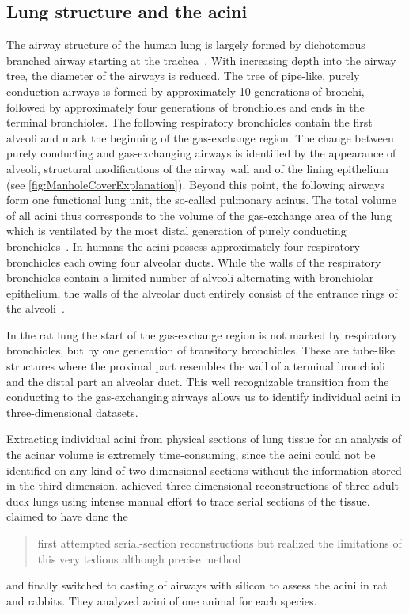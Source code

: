 \documentclass[paper=a4,DIV=calc,abstract,english]{scrartcl}
\begin{document}
\subsection{Lung structure and the acini}
The airway structure of the human lung is largely formed by dichotomous branched airway starting at the trachea~\citep{Weibel1991}.
With increasing depth into the airway tree, the diameter of the airways is reduced.
The tree of pipe-like, purely conduction airways is formed by approximately 10 generations of bronchi, followed by approximately four generations of bronchioles and ends in the terminal bronchioles.
The following respiratory bronchioles contain the first alveoli and mark the beginning of the gas-exchange region.
The change between purely conducting and gas-exchanging airways is identified by the appearance of alveoli, structural modifications of the airway wall and of the lining epithelium (see \autoref{fig:ManholeCoverExplanation}).
Beyond this point, the following airways form one functional lung unit, the so-called pulmonary acinus.
The total volume of all acini thus corresponds to the volume of the gas-exchange area of the lung which is ventilated by the most distal generation of purely conducting bronchioles~\citep{Rodriguez1987}.
In humans the acini possess approximately four respiratory bronchioles each owing four alveolar ducts.
While the walls of the respiratory bronchioles contain a limited number of alveoli alternating with bronchiolar epithelium, the walls of the alveolar duct entirely consist of the entrance rings of the alveoli~\citep{Schittny2007}.

In the rat lung the start of the gas-exchange region is not marked by respiratory bronchioles, but by one generation of transitory bronchioles.
These are tube-like structures where the proximal part resembles the wall of a terminal bronchioli and the distal part an alveolar duct.
This well recognizable transition from the conducting to the gas-exchanging airways allows us to identify individual acini in three-dimensional datasets.

Extracting individual acini from physical sections of lung tissue for an analysis of the acinar volume is extremely time-consuming, since the acini could not be identified on any kind of two-dimensional sections without the information stored in the third dimension.
\citet{Woodward2005} achieved three-dimensional reconstructions of three adult duck lungs using intense manual effort to trace serial sections of the tissue.
\citet{Rodriguez1987} claimed to have done the \blockquote{first attempted serial-section reconstructions but realized the limitations of this very tedious although precise method} and finally switched to casting of airways with silicon to assess the acini in rat and rabbits.
They analyzed acini of one animal for each species.
\end{document}
